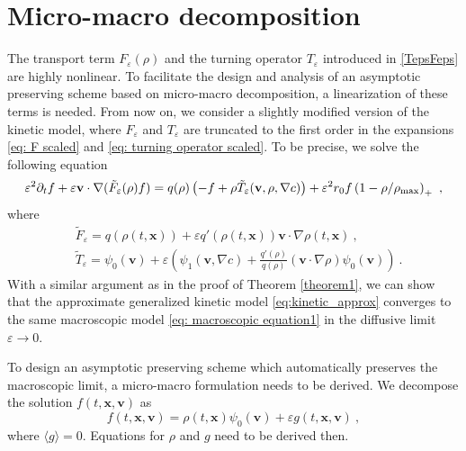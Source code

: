 \documentclass{aims} %
\theoremstyle{definition}
\newcommand {\e}  {\varepsilon}
\newcommand {\bv} { {\mathbf{v}} }
\newcommand {\bx} { {\mathbf{x}} }
\newcommand {\p}   {\partial}
\newcommand{\beq}{\begin{equation}}
\newcommand{\eeq}{\end{equation}}
\begin{document}
\section{Micro-macro decomposition}\label{sec:micro-macro}
The transport term $F_\varepsilon(\rho)$ and the turning operator $T_\varepsilon$ introduced in \eqref{TepsFeps} are highly nonlinear.
To facilitate the design and analysis of an asymptotic preserving scheme based on micro-macro decomposition, a linearization of these terms is needed. 
From now on, we consider a slightly modified version of the kinetic model, where $F_\varepsilon$ and $T_\varepsilon$ are truncated to the first order in the expansions \eqref{eq: F scaled} and \eqref{eq: turning operator scaled}.
To be precise, we solve the following equation 
\beq
\label{eq:kinetic_approx}
	\e^2 \p_t f + \e \bv \cdot \nabla(\tilde{F}_\varepsilon(\rho)f) = q(\rho) \left(-f + \rho \tilde{T}_\varepsilon(\bv, \rho, \nabla c)\right) + \e^2 r_0f\left(1-\rho/\rho_{\textnormal{max}}\right)_+\ ,
\eeq
where
\begin{align*}
    &\tilde{F}_\varepsilon = q(\rho(t,\bx)) + \varepsilon q'(\rho(t,\bx))\bv\cdot\nabla\rho(t,\bx)\ ,\\
    &\tilde{T}_\varepsilon = \psi_0(\bv) + \varepsilon\left(\psi_1(\bv,\nabla c) + \frac{q'(\rho)}{q(\rho)}(\bv\cdot\nabla\rho)\psi_0(\bv)\right)\ .
\end{align*}
With a similar argument as in the proof of Theorem \ref{theorem1}, we can show that the approximate generalized kinetic model \eqref{eq:kinetic_approx} converges to the same macroscopic model \eqref{eq: macroscopic equation1} in the diffusive limit $\varepsilon\to 0$.

To design an asymptotic preserving scheme which automatically preserves the macroscopic limit, a micro-macro formulation needs to be derived. 
We decompose the solution $f(t,\bx,\bv)$ as 
\begin{equation}\label{def:f_decompose}
    f(t,\bx,\bv) = \rho(t,\bx) \psi_0(\bv) + \varepsilon g(t,\bx,\bv)\ ,
\end{equation}
where $\langle g\rangle = 0$. 
Equations for $\rho$ and $g$ need to be derived then. 
\end{document}
